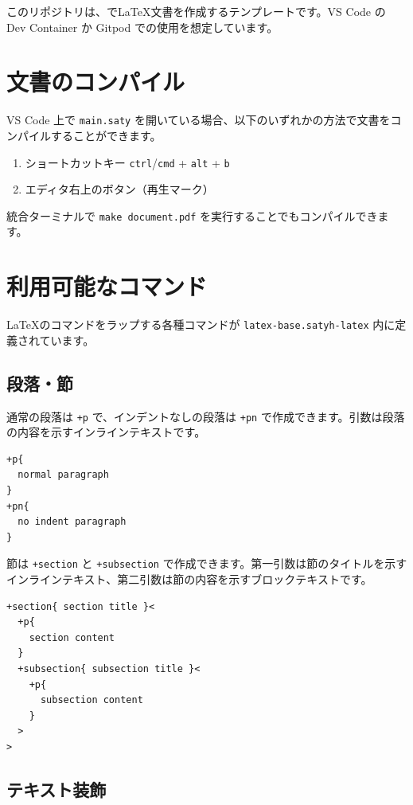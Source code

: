 

このリポジトリは、\SATySFi で\LaTeX 文書を作成するテンプレートです。VS Code の Dev Container か Gitpod での使用を想定しています。

\section{文書のコンパイル}

VS Code 上で \verb$main.saty$ を開いている場合、以下のいずれかの方法で文書をコンパイルすることができます。

\begin{enumerate}
  \item ショートカットキー \verb$ctrl$/\verb$cmd$ + \verb$alt$ + \verb$b$
  \item エディタ右上のボタン（再生マーク）
\end{enumerate}


統合ターミナルで \verb$make document.pdf$ を実行することでもコンパイルできます。

\section{利用可能なコマンド}

\LaTeX のコマンドをラップする各種コマンドが \verb$latex-base.satyh-latex$ 内に定義されています。

\subsection{段落・節}

通常の段落は \verb$+p$ で、インデントなしの段落は \verb$+pn$ で作成できます。引数は段落の内容を示すインラインテキストです。

\begin{lstlisting}
+p{
  normal paragraph
}
+pn{
  no indent paragraph
}
\end{lstlisting}

節は \verb$+section$ と \verb$+subsection$ で作成できます。第一引数は節のタイトルを示すインラインテキスト、第二引数は節の内容を示すブロックテキストです。

\begin{lstlisting}
+section{ section title }<
  +p{
    section content
  }
  +subsection{ subsection title }<
    +p{
      subsection content
    }
  >
>
\end{lstlisting}

\subsection{テキスト装飾}

